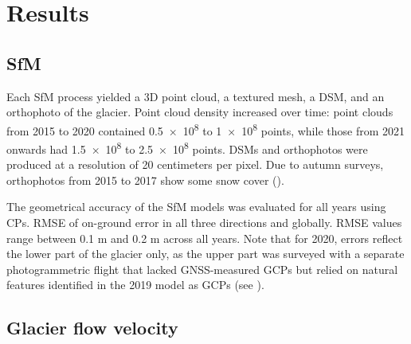 \section{Results}\label{sec:3:res}

\subsection{SfM}\label{sec:3:res:sfm}

Each SfM process yielded a 3D point cloud, a textured mesh, a DSM, and an orthophoto of the glacier. 
Point cloud density increased over time: point clouds from 2015 to 2020 contained \SI{0.5e8}{} to \SI{1e8}{} 
points, while those from 2021 onwards had \SI{1.5e8}{} to \SI{2.5e8}{} points. 
DSMs and orthophotos were produced at a resolution of 20 centimeters per pixel.
Due to autumn surveys, orthophotos from 2015 to 2017 show some snow cover ().

The geometrical accuracy of the SfM models was evaluated for all years using CPs.
 RMSE of on-ground error in all three directions and globally. 
RMSE values range between 0.1 m and 0.2 m across all years. 
Note that for 2020, errors reflect the lower part of the glacier only, as the upper part was
surveyed with a separate photogrammetric flight that lacked GNSS-measured GCPs but relied on
natural features identified in the 2019 model as GCPs (see ).


\subsection{Glacier flow velocity}\label{sec:3:res:velocity}


